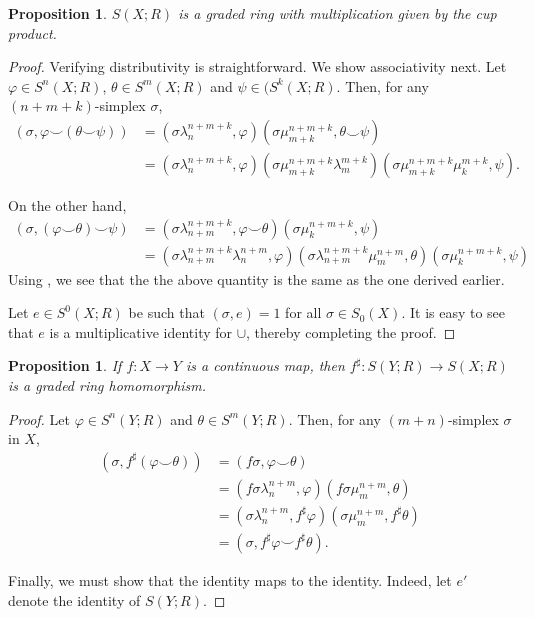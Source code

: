 \documentclass[10pt]{article}
\theoremstyle{thmstyle}
\newtheorem{proposition}[theorem]{Proposition}
\theoremstyle{defstyle}
\begin{document}
\begin{proposition}
    $S(X; R)$ is a graded ring with multiplication given by the cup product.
\end{proposition}
\begin{proof}
    Verifying distributivity is straightforward. We show associativity next. Let $\varphi\in S^n(X; R)$, $\theta\in S^m(X; R)$ and $\psi\in (S^k(X; R)$. Then, for any $(n + m + k)$-simplex $\sigma$,
    \begin{align*}
        (\sigma, \varphi\smile(\theta\smile\psi)) &= (\sigma\lambda^{n + m + k}_{n}, \varphi)(\sigma\mu^{n + m + k}_{m + k}, \theta\smile\psi)\\
        &= (\sigma\lambda_n^{n + m + k}, \varphi)(\sigma\mu_{m + k}^{n + m + k}\lambda^{m + k}_m)(\sigma\mu^{n + m + k}_{m + k}\mu^{m + k}_k, \psi).
    \end{align*}

    On the other hand, 
    \begin{align*}
        (\sigma, (\varphi\smile\theta)\smile\psi) &= (\sigma\lambda^{n + m + k}_{n + m}, \varphi\smile\theta)(\sigma\mu^{n + m + k}_k, \psi)\\
        &= (\sigma\lambda^{n + m + k}_{n + m}\lambda^{n + m}_{n}, \varphi)(\sigma\lambda^{n + m + k}_{n + m}\mu^{n + m}_m, \theta)(\sigma\mu^{n + m + k}_k, \psi)
    \end{align*}
    Using , we see that the the above quantity is the same as the one derived earlier.

    Let $e\in S^0(X; R)$ be such that $(\sigma, e) = 1$ for all $\sigma\in S_0(X)$. It is easy to see that $e$ is a multiplicative identity for $\cup$, thereby completing the proof.
\end{proof}

\begin{proposition}
    If $f: X\to Y$ is a continuous map, then $f^\sharp: S(Y; R)\to S(X; R)$ is a graded ring homomorphism.
\end{proposition}
\begin{proof}
    Let $\varphi\in S^n(Y; R)$ and $\theta\in S^m(Y; R)$. Then, for any $(m + n)$-simplex $\sigma$ in $X$, 
    \begin{align*}
        (\sigma, f^\sharp(\varphi\smile\theta)) &= (f\sigma, \varphi\smile\theta)\\
        &= (f\sigma\lambda^{n + m}_n, \varphi)(f\sigma\mu^{n + m}_m, \theta)\\
        &= (\sigma\lambda^{n + m}_n, f^\sharp\varphi)(\sigma\mu^{n + m}_m, f^\sharp\theta)\\
        &= (\sigma, f^\sharp\varphi\smile f^\sharp\theta).
    \end{align*}

    Finally, we must show that the identity maps to the identity. Indeed, let $e'$ denote the identity of $S(Y; R)$.
\end{proof}
\end{document}
